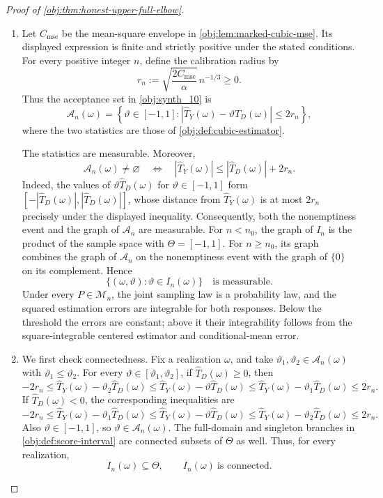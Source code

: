 \documentclass[11pt]{article}
\begin{document}
\begin{proof}[Proof of \cref{obj:thm:honest-upper-full-elbow}]
\begin{enumerate}
\item
Let \(C_{\mathrm{mse}}\) be the mean-square envelope in
\cref{obj:lem:marked-cubic-mse}. Its displayed expression is finite and strictly positive under the stated conditions. For every positive integer \(n\), define the calibration radius by
\[
r_n:=\sqrt{\frac{2C_{\mathrm{mse}}}{\alpha}}\,n^{-1/3}\ge0.
\]
Thus the acceptance set in \cref{obj:synth_10} is
\[
\mathcal A_n(\omega)
=
\left\{\vartheta\in[-1,1]:
\left|\widehat T_Y(\omega)-\vartheta\widehat T_D(\omega)\right|
\le2r_n\right\},
\]
where the two statistics are those of \cref{obj:def:cubic-estimator}.

The statistics are measurable. Moreover,
\[
\mathcal A_n(\omega)\ne\varnothing
\quad\Longleftrightarrow\quad
|\widehat T_Y(\omega)|
\le|\widehat T_D(\omega)|+2r_n.
\]
Indeed, the values of \(\vartheta\widehat T_D(\omega)\) for
\(\vartheta\in[-1,1]\) form
\([ -|\widehat T_D(\omega)|,|\widehat T_D(\omega)|]\), whose distance from
\(\widehat T_Y(\omega)\) is at most \(2r_n\) precisely under the displayed inequality. Consequently, both the nonemptiness event and the graph of \(\mathcal A_n\) are measurable. For \(n<n_0\), the graph of \(I_n\) is the product of the sample space with \(\Theta=[-1,1]\). For \(n\ge n_0\), its graph combines the graph of \(\mathcal A_n\) on the nonemptiness event with the graph of \(\{0\}\) on its complement. Hence
\[
\{(\omega,\vartheta):\vartheta\in I_n(\omega)\}
\quad\text{is measurable}.
\]
Under every \(P\in\mathcal M_n\), the joint sampling law is a probability law, and the squared estimation errors are integrable for both responses. Below the threshold the errors are constant; above it their integrability follows from the square-integrable centered estimator and conditional-mean error.

\item
We first check connectedness. Fix a realization \(\omega\), and take
\(\vartheta_1,\vartheta_2\in\mathcal A_n(\omega)\) with
\(\vartheta_1\le\vartheta_2\). For every
\(\vartheta\in[\vartheta_1,\vartheta_2]\), if
\(\widehat T_D(\omega)\ge0\), then
\[
-2r_n
\le \widehat T_Y(\omega)-\vartheta_2\widehat T_D(\omega)
\le \widehat T_Y(\omega)-\vartheta\widehat T_D(\omega)
\le \widehat T_Y(\omega)-\vartheta_1\widehat T_D(\omega)
\le2r_n.
\]
If \(\widehat T_D(\omega)<0\), the corresponding inequalities are
\[
-2r_n
\le \widehat T_Y(\omega)-\vartheta_1\widehat T_D(\omega)
\le \widehat T_Y(\omega)-\vartheta\widehat T_D(\omega)
\le \widehat T_Y(\omega)-\vartheta_2\widehat T_D(\omega)
\le2r_n.
\]
Also \(\vartheta\in[-1,1]\), so \(\vartheta\in\mathcal A_n(\omega)\).
The full-domain and singleton branches in \cref{obj:def:score-interval}
are connected subsets of \(\Theta\) as well. Thus, for every realization,
\[
I_n(\omega)\subseteq\Theta,
\qquad I_n(\omega)\ \text{is connected}.
\]


\end{enumerate}
\end{proof}
\end{document}
